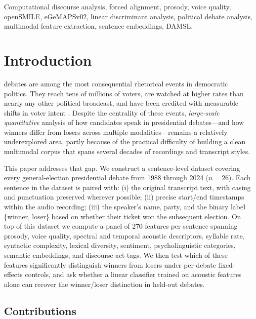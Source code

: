 \documentclass[journal]{IEEEtran}
\begin{document}
\begin{IEEEkeywords}
Computational discourse analysis, forced alignment, prosody,
voice quality, openSMILE, eGeMAPSv02, linear discriminant analysis,
political debate analysis, multimodal feature extraction,
sentence embeddings, DAMSL.
\end{IEEEkeywords}

\section{Introduction}
\label{sec:intro}

 debates are among the most consequential
rhetorical events in democratic politics. They reach tens of millions
of voters, are watched at higher rates than nearly any other political
broadcast, and have been credited with measurable shifts in voter
intent \cite{benoit2014debates}. Despite the centrality of these events,
\emph{large-scale quantitative} analysis of how candidates speak in
presidential debates---and how winners differ from losers across
multiple modalities---remains a relatively underexplored area, partly
because of the practical difficulty of building a clean multimodal
corpus that spans several decades of recordings and transcript styles.

This paper addresses that gap. We construct a sentence-level dataset
covering every general-election presidential debate from 1988 through
2024 ($n = 26$). Each sentence in the dataset is paired with: (i) the
original transcript text, with casing and punctuation preserved
wherever possible; (ii) precise start/end timestamps within the audio
recording; (iii) the speaker's name, party, and the binary label
\{winner, loser\} based on whether their ticket won the subsequent
election. On top of this dataset we compute a panel of $270$ features
per sentence spanning prosody, voice quality, spectral and temporal
acoustic descriptors, syllable rate, syntactic complexity, lexical
diversity, sentiment, psycholinguistic categories, semantic embeddings,
and discourse-act tags. We then test which of these features
significantly distinguish winners from losers under per-debate
fixed-effects controls, and ask whether a linear classifier trained on
acoustic features alone can recover the winner/loser distinction in
held-out debates.

\subsection{Contributions}
\end{document}
